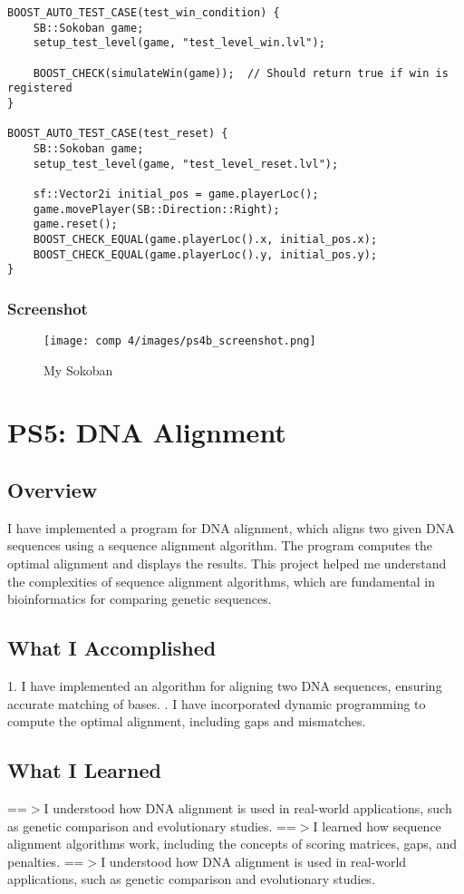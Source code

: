 \documentclass[12pt]{article}
\begin{document}
\begin{lstlisting}[style=cppcode]
BOOST_AUTO_TEST_CASE(test_win_condition) {
    SB::Sokoban game;
    setup_test_level(game, "test_level_win.lvl");

    BOOST_CHECK(simulateWin(game));  // Should return true if win is registered
}

BOOST_AUTO_TEST_CASE(test_reset) {
    SB::Sokoban game;
    setup_test_level(game, "test_level_reset.lvl");

    sf::Vector2i initial_pos = game.playerLoc();
    game.movePlayer(SB::Direction::Right);
    game.reset();
    BOOST_CHECK_EQUAL(game.playerLoc().x, initial_pos.x);
    BOOST_CHECK_EQUAL(game.playerLoc().y, initial_pos.y);
}

\end{lstlisting}
\subsubsection{Screenshot}
\begin{figure}[tbh]
	\centering
	\texttt{[image: comp 4/images/ps4b\_screenshot.png]}
	\caption{My Sokoban}
\end{figure}
\newpage
\section{PS5: DNA Alignment}
\subsection{Overview}
I have implemented a program for DNA alignment, which aligns two given DNA sequences using a sequence alignment algorithm. The program computes the optimal alignment and displays the results. This project helped me understand the complexities of sequence alignment algorithms, which are fundamental in bioinformatics for comparing genetic sequences.
\subsection{What I Accomplished}
1. I have implemented an algorithm for aligning two DNA sequences, ensuring accurate matching of bases.
. I have incorporated dynamic programming to compute the optimal alignment, including gaps and mismatches.

\subsection{What I Learned}
==$>$I understood how DNA alignment is used in real-world applications, such as genetic comparison and evolutionary studies.
\newline
==$>$I learned how sequence alignment algorithms work, including the concepts of scoring matrices, gaps, and penalties.
\newline
==$>$I understood how DNA alignment is used in real-world applications, such as genetic comparison and evolutionary studies.
\end{document}

